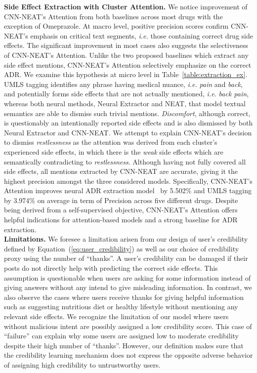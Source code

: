 \documentclass{bmcart}
\begin{document}
{\bf Side Effect Extraction with Cluster Attention.} We notice improvement of CNN-NEAT's Attention from both baselines across most drugs with the exception of Omeprazole. At macro level, positive precision scores confirm CNN-NEAT's emphasis on critical text segments, \textit{i.e.} those containing correct drug side effects. The significant improvement in most cases also suggests the selectiveness of CNN-NEAT's Attention. Unlike the two proposed baselines which extract any side effect mentions, CNN-NEAT's Attention selectively emphasize on the correct ADR. We examine this hypothesis at micro level in Table~\ref{table:extraction_ex}. UMLS tagging identifies any phrase having medical nuance, \textit{i.e.} \textit{pain} and \textit{back}, and potentially forms side effects that are not actually mentioned, \textit{i.e.} \textit{back pain}, whereas both neural methods, Neural Extractor and NEAT, that model textual semantics are able to dismiss such trivial mentions. \textit{Discomfort}, although correct, is questionably an intentionally reported side effects and is also dismissed by both Neural Extractor and CNN-NEAT. We attempt to explain CNN-NEAT's decision to dismiss \textit{restlessness} as the attention was derived from each cluster's experienced side effects, in which there is the \textit{weak} side effects which are semantically contradicting to \textit{restlessness}. Although having not fully covered all side effects, all mentions extracted by CNN-NEAT are accurate, giving it the highest precision amongst the three considered models. Specifically, CNN-NEAT's Attention improves neural ADR extraction model~\cite{ding2018attentive} by 5.502\% and UMLS tagging by 3.974\% on average in term of Precision across five different drugs. Despite being derived from a self-supervised objective, CNN-NEAT's Attention offers helpful indications for attention-based models and a strong baseline for ADR extraction. \\

{\bf Limitations.} We foresee a limitation arisen from our design of user's credibility defined by Equation~(\ref{eq:user_credibility}) as well as our choice of credibility proxy using the number of ``thanks''. A user's credibility can be damaged if their posts do not directly help with predicting the correct side effects. 
This assumption is questionable when users are asking for some information instead of giving answers without any intend to give misleading information. 
In contrast, we also observe the cases where users receive thanks for giving helpful information such as suggesting nutritious diet or healthy lifestyle without mentioning any relevant side effects. We recognize the limitation of our model where users without malicious intent are possibly assigned a low credibility score. This case of ``failure'' can explain why some users are assigned low to moderate credibility despite their high number of ``thanks''. However, our definition makes sure that the credibility learning mechanism does not express the opposite adverse behavior of assigning high credibility to untrustworthy users.
\end{document}
